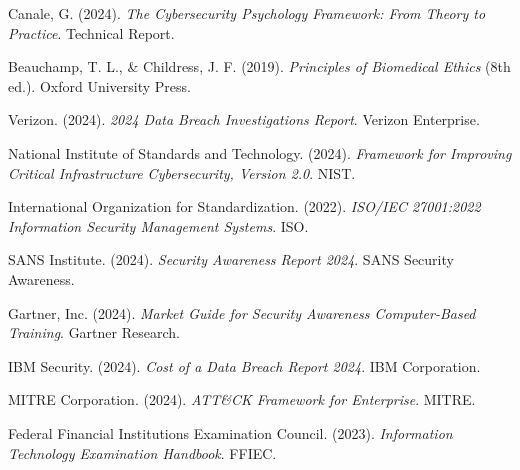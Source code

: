 \documentclass[10pt, twocolumn]{article}
\begin{document}
\begin{thebibliography}{99}

Canale, G. (2024). \textit{The Cybersecurity Psychology Framework: From Theory to Practice}. Technical Report.

Beauchamp, T. L., \& Childress, J. F. (2019). \textit{Principles of Biomedical Ethics} (8th ed.). Oxford University Press.

Verizon. (2024). \textit{2024 Data Breach Investigations Report}. Verizon Enterprise.

National Institute of Standards and Technology. (2024). \textit{Framework for Improving Critical Infrastructure Cybersecurity, Version 2.0}. NIST.

International Organization for Standardization. (2022). \textit{ISO/IEC 27001:2022 Information Security Management Systems}. ISO.

SANS Institute. (2024). \textit{Security Awareness Report 2024}. SANS Security Awareness.

Gartner, Inc. (2024). \textit{Market Guide for Security Awareness Computer-Based Training}. Gartner Research.

IBM Security. (2024). \textit{Cost of a Data Breach Report 2024}. IBM Corporation.

MITRE Corporation. (2024). \textit{ATT\&CK Framework for Enterprise}. MITRE.

Federal Financial Institutions Examination Council. (2023). \textit{Information Technology Examination Handbook}. FFIEC.

\end{thebibliography}
\end{document}
